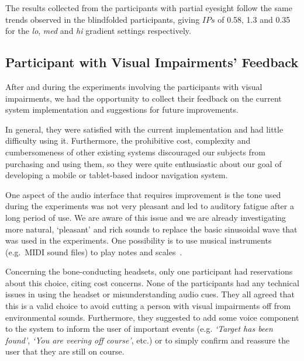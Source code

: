 \documentclass[sigconf, screen=true, anonymous=true]{acmart}
\begin{document}
The results collected from the participants with partial eyesight follow the same trends observed in the blindfolded participants, giving $IPs$ of 0.58, 1.3 and 0.35 for the \emph{lo}, \emph{med} and \emph{hi} gradient settings respectively.  

\subsection{Participant with Visual Impairments' Feedback}

After and during the experiments involving the participants with visual impairments, we had the opportunity to collect their feedback on the current system implementation and suggestions for future improvements.

In general, they were satisfied with the current implementation and had little difficulty using it.
Furthermore, the prohibitive cost, complexity and cumbersomeness of other existing systems discouraged our subjects from purchasing and using them, so they were quite enthusiastic about our goal of developing a mobile or tablet-based indoor navigation system. 

One aspect of the audio interface that requires improvement is the tone used during the experiments was not very pleasant and led to auditory fatigue after a long period of use.
We are aware of this issue and we are already investigating more natural, `pleasant' and rich sounds to replace the basic sinusoidal wave that was used in the experiments.
One possibility is to use musical instruments (e.g.\ MIDI sound files) to play notes and scales~\cite{brewster1998using}.

Concerning the bone-conducting headsets, only one participant had reservations about this choice, citing cost concerns.
None of the participants had any technical issues in using the headset or misunderstanding audio cues.
They all agreed that this is a valid choice to avoid cutting a person with visual impairments off from environmental sounds.
Furthermore, they suggested to add some voice component to the system to inform the user of important events (e.g. \emph{`Target has been found'}, \emph{`You are veering off course'}, etc.) or to simply confirm and reassure the user that they are still on course.

\end{document}
